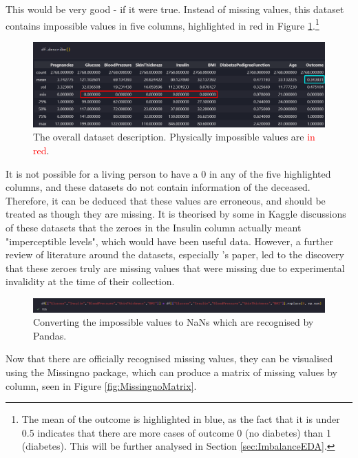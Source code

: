 \documentclass[12pt]{report}
\newcommand{\para}{\vspace{8pt}\noindent}
\begin{document}
\para This would be very good - if it were true. Instead of missing values, this dataset contains impossible values in five columns, highlighted in red in 
Figure \ref{fig:ImpossibleValues}.\footnote{The mean of the outcome is highlighted in blue, as the fact that it is under 0.5 indicates that there are more 
cases of outcome 0 (no diabetes) than 1 (diabetes). This will be further analysed in Section \ref{sec:ImbalanceEDA}.}

\begin{figure}[H]
    \centering
    \includegraphics[width=\linewidth]{EDA/ImpossibleValues.png}
    \caption{The overall dataset description. Physically impossible values are \textcolor{red}{in red}.}
    \label{fig:ImpossibleValues}
\end{figure}

\para It is not possible for a living person to have a 0 in any of the five highlighted columns, and these datasets do not contain information of the deceased.
Therefore, it can be deduced that these values are erroneous, and should be treated as though they are missing. It is theorised by some in Kaggle discussions of these 
datasets that the zeroes in the Insulin column actually meant "imperceptible levels", which would have been useful data. However, a further review of literature around the datasets,
especially \textcite{hayashi_rule_2016}'s paper, led to the discovery that these zeroes truly are missing values that were missing due to experimental invalidity at the time 
of their collection.

\begin{figure}[H]
    \centering
    \includegraphics[width=\linewidth]{EDA/ConvertImpossibleValues-NoSums.png} %
    \caption{Converting the impossible values to NaNs which are recognised by Pandas.}
    \label{fig:ConvertImpossibleValues}
\end{figure}

\para Now that there are officially recognised missing values, they can be visualised using the Missingno package, which can produce a 
matrix of missing values by column, seen in Figure \ref{fig:MissingnoMatrix}.
\end{document}
